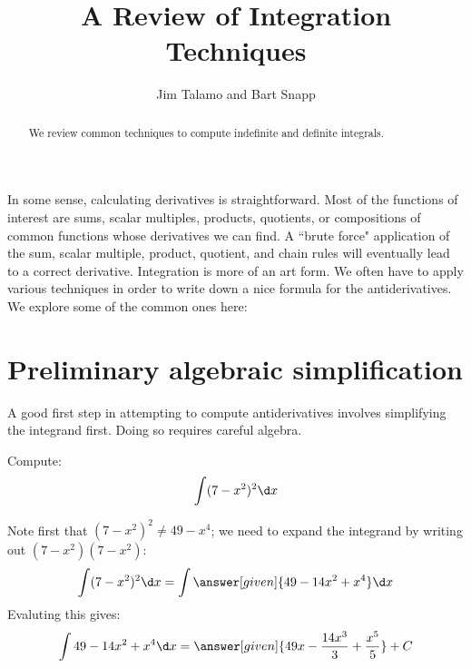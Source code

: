 \documentclass[nooutcomes]{ximera}
\author{Jim Talamo and Bart Snapp}
\title[Dig-In:]{A Review of Integration Techniques}
\begin{document}
\begin{abstract}
  We review common techniques to compute indefinite and definite integrals.
\end{abstract}
\maketitle

In some sense, calculating derivatives is straightforward.  Most of the functions of interest are sums, scalar multiples, products, quotients, or compositions of common functions whose derivatives we can find.  A ``brute force" application of the sum, scalar multiple, product, quotient, and chain rules will eventually lead to a correct derivative.  Integration is more of an art form.  We often have to apply various techniques in order to write down a nice formula for the antiderivatives. We explore some of the common ones here:

\section{Preliminary algebraic simplification}

A good first step in attempting to compute antiderivatives involves simplifying the integrand first.  Doing so requires careful algebra.
\begin{example}
  Compute:
  \[
  \int (7-x^2)^2 \d x
  \]
  \begin{explanation}
   Note first that $(7-x^2)^2 \neq 49-x^4$; we need to expand the integrand by writing out $(7-x^2)(7-x^2)$:
    \[
    \int (7-x^2)^2 \d x  = \int \answer[given]{49 - 14x^2 + x^4} \d x
    \]
Evaluting this gives:
    \[
    \int 49 - 14x^2 + x^4 \d x = \answer[given]{49x - \frac{14 x^3}{3} + \frac{x^5}{5}} + C
    \]
  \end{explanation}
\end{example}

%
%
%
 
\end{document}
